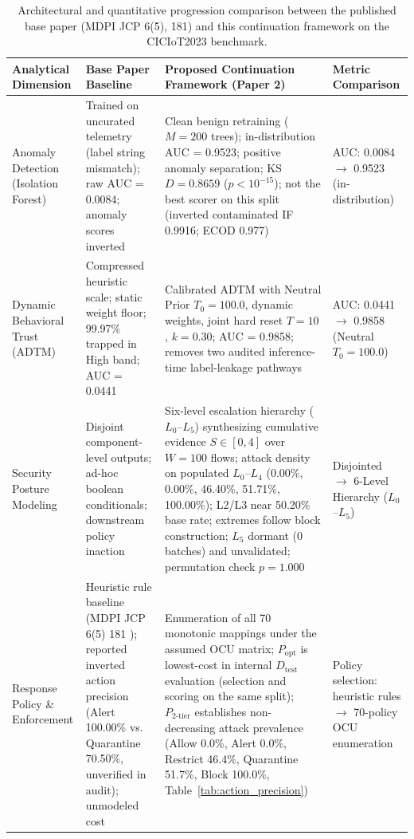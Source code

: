 \documentclass[journal,10pt,onecolumn]{IEEEtran}
\begin{document}
\begin{table}[t]
\caption{Architectural and quantitative progression comparison between the published base paper \cite{1} (MDPI JCP 6(5), 181) and this continuation framework on the CICIoT2023 benchmark.}
\label{tab:paper_comparison}
\centering
\small
\begin{tabular}{p{3.2cm}p{5.5cm}p{5.5cm}p{2.0cm}}
\toprule
\textbf{Analytical Dimension} & \textbf{Base Paper Baseline \cite{1}} & \textbf{Proposed Continuation Framework (Paper 2)} & \textbf{Metric Comparison} \\
\midrule
Anomaly Detection (Isolation Forest) & Trained on uncurated telemetry (label string mismatch); raw AUC = 0.0084; anomaly scores inverted & Clean benign retraining ($M=200$ trees); in-distribution AUC = 0.9523; positive anomaly separation; KS $D = 0.8659$ ($p < 10^{-15}$); not the best scorer on this split (inverted contaminated IF 0.9916; ECOD 0.977) & AUC: 0.0084 $\to$ 0.9523 (in-distribution) \\
Dynamic Behavioral Trust (ADTM) & Compressed heuristic scale; static weight floor; 99.97\% trapped in High band; AUC = 0.0441 & Calibrated ADTM with Neutral Prior $T_0=100.0$, dynamic weights, joint hard reset $T=10$, $k=0.30$; AUC = 0.9858; removes two audited inference-time label-leakage pathways & AUC: 0.0441 $\to$ 0.9858 (Neutral $T_0 = 100.0$) \\
Security Posture Modeling & Disjoint component-level outputs; ad-hoc boolean conditionals; downstream policy inaction & Six-level escalation hierarchy ($L_0$--$L_5$) synthesizing cumulative evidence $S \in [0, 4]$ over $W=100$ flows; attack density on populated $L_0$--$L_4$ (0.00\%, 0.00\%, 46.40\%, 51.71\%, 100.00\%); L2/L3 near 50.20\% base rate; extremes follow block construction; $L_5$ dormant (0 batches) and unvalidated; permutation check $p = 1.000$ & Disjointed $\to$ 6-Level Hierarchy ($L_0$--$L_5$) \\
Response Policy \& Enforcement & Heuristic rule baseline (MDPI JCP 6(5) 181 \cite{1}); reported inverted action precision (Alert 100.00\% vs. Quarantine 70.50\%, unverified in audit); unmodeled cost & Enumeration of all 70 monotonic mappings under the assumed OCU matrix; $P_{\text{opt}}$ is lowest-cost in internal $D_{\text{test}}$ evaluation (selection and scoring on the same split); $P_{2\text{-tier}}$ establishes non-decreasing attack prevalence (Allow 0.0\%, Alert 0.0\%, Restrict 46.4\%, Quarantine 51.7\%, Block 100.0\%, Table~\ref{tab:action_precision}) & Policy selection: heuristic rules $\to$ 70-policy OCU enumeration \\

\end{tabular}
\end{table}
\end{document}
